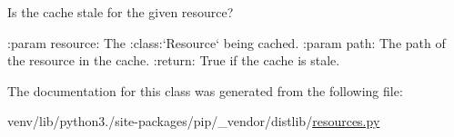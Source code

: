 \begin{DoxyVerb}Is the cache stale for the given resource?

:param resource: The :class:`Resource` being cached.
:param path: The path of the resource in the cache.
:return: True if the cache is stale.
\end{DoxyVerb}
 

The documentation for this class was generated from the following file\+:\begin{DoxyCompactItemize}
\item 
venv/lib/python3./site-\/packages/pip/\+\_\+vendor/distlib/\hyperlink{resources_8py}{resources.\+py}\end{DoxyCompactItemize}
